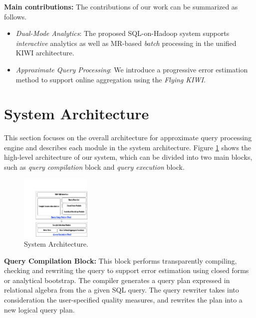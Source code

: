 \documentclass{sig-alternate-05-2015}
\newcommand{\bi}{\begin{itemize}}
\newcommand{\ei}{\end{itemize}}
\newcommand{\ii}{\item}
\begin{document}
\noindent
\textbf{Main contributions:} 
The contributions of our work can be summarized as follows. 
\bi
\ii \textit{Dual-Mode Analytics}: 
The proposed SQL-on-Hadoop system supports \textit{interactive} analytics as well as MR-based \textit{batch} processing in the unified KIWI architecture.
\ii \textit{Approximate Query Processing}: 
We introduce a progressive error estimation method to support online aggregation using the \textit{Flying KIWI}.
\ei
\section{System Architecture}
This section focuses on the overall architecture for approximate query processing engine and describes each module in the system architecture. Figure \ref{fig:architecture} shows the high-level architecture of our system, which can be divided into two main blocks, such as \textit{query compilation} block and \textit{query execution} block.
\begin{figure}[htb]
        \centering
        \includegraphics[width=0.3\textwidth]{sys-architecture.pdf}
        \caption{System Architecture.}
        \label{fig:architecture}
\end{figure}

\noindent
\textbf{Query Compilation Block:} 
This block performs transparently compiling, checking and rewriting the query to support error estimation using closed forms or analytical bootstrap. The compiler generates a query plan expressed in relational algebra from the a given SQL query. 
The query rewriter takes into consideration the user-specified quality measures, and rewrites the plan into a new logical query plan.
\end{document}
